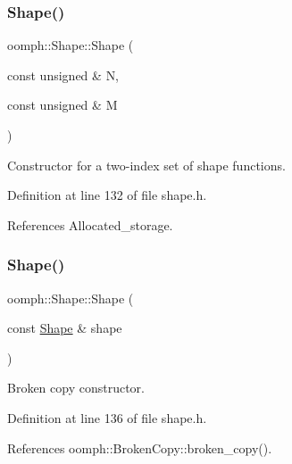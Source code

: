 \mbox{\label{classoomph_1_1Shape_ad892f46ca3265ba654bb4df164890505}} 
\subsubsection{\texorpdfstring{Shape()}{Shape()}\hspace{0.1cm}{\footnotesize\ttfamily [2/4]}}
{\footnotesize\ttfamily oomph\+::\+Shape\+::\+Shape (\begin{DoxyParamCaption}\item[{const unsigned \&}]{N,  }\item[{const unsigned \&}]{M }\end{DoxyParamCaption})\hspace{0.3cm}{\ttfamily [inline]}}



Constructor for a two-\/index set of shape functions. 



Definition at line 132 of file shape.\+h.



References Allocated\+\_\+storage.

\mbox{\label{classoomph_1_1Shape_aef6de818ca2298d6a7db1b2175bb94fa}} 
\subsubsection{\texorpdfstring{Shape()}{Shape()}\hspace{0.1cm}{\footnotesize\ttfamily [3/4]}}
{\footnotesize\ttfamily oomph\+::\+Shape\+::\+Shape (\begin{DoxyParamCaption}\item[{const \hyperlink{classoomph_1_1Shape}{Shape} \&}]{shape }\end{DoxyParamCaption})\hspace{0.3cm}{\ttfamily [inline]}}



Broken copy constructor. 



Definition at line 136 of file shape.\+h.



References oomph\+::\+Broken\+Copy\+::broken\+\_\+copy().

